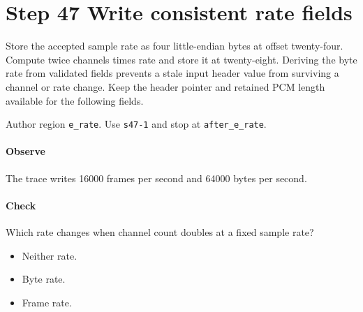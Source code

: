 \section{Step 47 Write consistent rate fields}\label{pcm-wav-s47}
Store the accepted sample rate as four little-endian bytes at offset twenty-four. Compute twice channels times rate and store it at twenty-eight. Deriving the byte rate from validated fields prevents a stale input header value from surviving a channel or rate change. Keep the header pointer and retained PCM length available for the following fields.

Author region \texttt{e\_rate}. Use \texttt{s47-1} and stop at \texttt{after\_e\_rate}.

\paragraph{Observe} The trace writes 16000 frames per second and 64000 bytes per second.

\paragraph{Check} Which rate changes when channel count doubles at a fixed sample rate?
\begin{itemize}
\item[A.] Neither rate.
\item[B.] Byte rate.
\item[C.] Frame rate.
\end{itemize}

